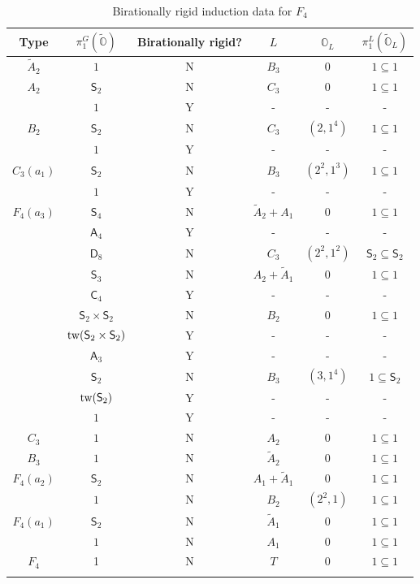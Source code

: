 \documentclass[11pt]{amsart}
\renewcommand{\O}{{\mathbb O}}
\newcommand{\Dih}{{\mathsf{D}}}
\newcommand{\Alt}{{\mathsf{A}}}
\newcommand{\Sym}{{\mathsf{S}}}
\newcommand{\Cyc}{{\mathsf{C}}}
\newcommand{\tw}{{{\mbox{\rm tw}}}}
\newcommand{\covO}{\widetilde{\O}}
\numberwithin{equation}{section}
\begin{document}
	
	\renewcommand{\arraystretch}{2}
	\begin{center}
		\begin{longtable}{|c|c|c|c|c|c|}
			\hline
			Type & $\pi_1^G(\covO)$ & Birationally rigid? & $L$ & $\O_L$ & $\pi_1^L(\covO_L)$\\ \hline
			\hline
			$\widetilde{A}_2$ & $1$ & N & $B_3$ & $0$ & $1\subseteq 1$  \\
			\hline
			$A_2$ & $\Sym_2$ & N & $C_3$ & $0$ & $1\subseteq 1$\\
			& $1$ & Y & - & - & - \\
			\hline
			$B_2$ & $\Sym_2$ & N & $C_3$ & $(2,1^4)$ & $1\subseteq 1$ \\
			& $1$ & Y & - & - & - \\
			\hline
			$C_3(a_1)$ & $\Sym_2$ & N & $B_3$ & $(2^2,1^3)$ & $1\subseteq 1$\\
			& $1$ & Y & - & - & - \\
			\hline
			$F_4(a_3)$ & $\Sym_4$ & N & $\widetilde{A}_2 + A_1$ & $0$ & $1\subseteq 1$ \\
			& $\Alt_4$ & Y & - & - & - \\
			& $\Dih_8$ & N & $C_3$ & $(2^2,1^2)$ & $\Sym_2\subseteq \Sym_2$ \\
			& $\Sym_3$ & N & $A_2 + \widetilde{A}_1$ & $0$ & $1\subseteq 1$ \\
			& $\Cyc_4$ & Y & - & - & - \\
			& $\Sym_2\times\Sym_2$ & N & $B_2$ & $0$ & $1\subseteq 1$\\
			& $\tw(\Sym_2\times \Sym_2)$& Y & - & - & - \\
			& $\Alt_3$  & Y & - & - & - \\
			& $\Sym_2$ & N & $B_3$ & $(3,1^4)$ & $1\subseteq \Sym_2$\\
			& $\tw(\Sym_2)$ & Y & - & - & - \\
			& $1$ & Y & - & - & - \\
			\hline
			$C_3$ & $1$ & N & $A_2$ & $0$ & $1\subseteq 1$\\
			\hline
			$B_3$ & $1$ & N & $\widetilde{A}_2$ & $0$ & $1\subseteq 1$ \\
			\hline
			$F_4(a_2)$ & $\Sym_2$ & N & $A_1 + \widetilde{A}_1$ & $0$ & $1\subseteq 1$\\
			& $1$ & N & $B_2$ & $(2^2,1)$ & $1\subseteq 1$\\
			\hline
			$F_4(a_1)$ & $\Sym_2$ & N& $\widetilde{A}_1$ & $0$ & $1\subseteq 1$\\
			& $1$ & N & $A_1$ & $0$ & $1\subseteq 1$\\
			\hline
			$F_4$ & 1 & N & $T$ & $0$ & $1\subseteq 1$ \\
			\hline 
			\caption{Birationally rigid induction data for $F_4$}\label{ta: F4}
		\end{longtable}
	\end{center}
	
\end{document}
